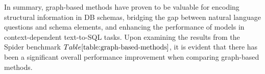 \begin{table}[H]
  \centering
  \caption{The exact match accuracy on the Spider dev set.}
  \label{table:graph-based-methods}
\end{table}

In summary, graph-based methods have proven to be valuable for encoding structural information in DB schemas, bridging the gap between natural language questions and schema elements, and enhancing the performance of models in context-dependent text-to-SQL tasks. Upon examining the results from the Spider benchmark \(Table\ref{table:graph-based-methods}\), it is evident that there has been a significant overall performance improvement when comparing graph-based methods.